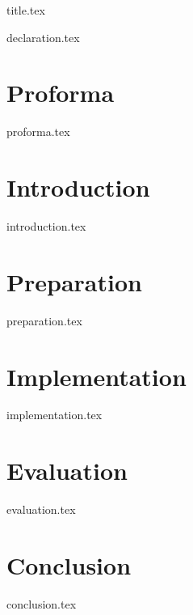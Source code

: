 \documentclass[oneside, a4paper,12pt]{book}
\begin{document}
\frontmatter
{title.tex}



{declaration.tex}

\chapter*{Proforma}
{proforma.tex}



\tableofcontents

\listoffigures
\listoftables


\mainmatter

\chapter{Introduction}\label{chapter:introduction}
{introduction.tex}

\chapter{Preparation}\label{chapter:preparation}
{preparation.tex}

\chapter{Implementation}\label{chapter:implementation}
{implementation.tex}

\chapter{Evaluation}\label{chapter:evaluation}
{evaluation.tex}

\chapter{Conclusion}\label{chapter:conclusion}
{conclusion.tex}


\backmatter


\printbibliography
\end{document}
